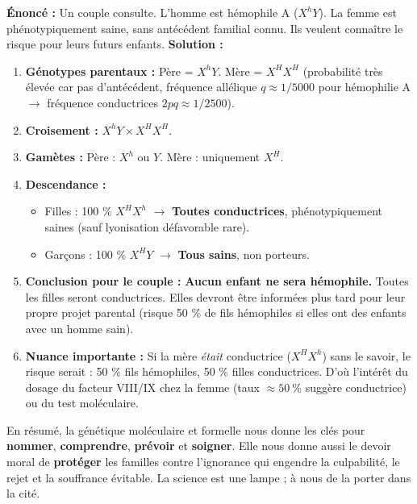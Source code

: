 \documentclass[11pt]{article}
\begin{document}
\begin{exoresolu}
\textbf{Énoncé :} Un couple consulte. L'homme est hémophile A ($X^h Y$). La femme est phénotypiquement saine, sans antécédent familial connu. Ils veulent connaître le risque pour leurs futurs enfants.
\textbf{Solution :}
\begin{enumerate}
    \item \textbf{Génotypes parentaux :} Père = $X^h Y$. Mère = $X^H X^H$ (probabilité très élevée car pas d'antécédent, fréquence allélique $q \approx 1/5000$ pour hémophilie A $\rightarrow$ fréquence conductrices $2pq \approx 1/2500$).
    \item \textbf{Croisement :} $X^h Y \times X^H X^H$.
    \item \textbf{Gamètes :} Père : $X^h$ ou $Y$. Mère : uniquement $X^H$.
    \item \textbf{Descendance :}
    \begin{itemize}
        \item Filles : 100 \% $X^H X^h$ $\rightarrow$ \textbf{Toutes conductrices}, phénotypiquement saines (sauf lyonisation défavorable rare).
        \item Garçons : 100 \% $X^H Y$ $\rightarrow$ \textbf{Tous sains}, non porteurs.
    \end{itemize}
    \item \textbf{Conclusion pour le couple :} \textbf{Aucun enfant ne sera hémophile.} Toutes les filles seront conductrices. Elles devront être informées plus tard pour leur propre projet parental (risque 50 \% de fils hémophiles si elles ont des enfants avec un homme sain).
    \item \textbf{Nuance importante :} Si la mère \emph{était} conductrice ($X^H X^h$) sans le savoir, le risque serait : 50 \% fils hémophiles, 50 \% filles conductrices. D'où l'intérêt du dosage du facteur VIII/IX chez la femme (taux $\approx 50\ \%$ suggère conductrice) ou du test moléculaire.
\end{enumerate}
\end{exoresolu}

\noindent En résumé, la génétique moléculaire et formelle nous donne les clés pour \textbf{nommer}, \textbf{comprendre}, \textbf{prévoir} et \textbf{soigner}. Elle nous donne aussi le devoir moral de \textbf{protéger} les familles contre l'ignorance qui engendre la culpabilité, le rejet et la souffrance évitable. La science est une lampe ; à nous de la porter dans la cité.
\end{document}
